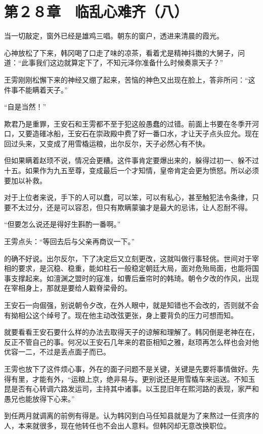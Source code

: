 \section{第２８章　临乱心难齐（八）}

当一切敲定，窗外已经是雄鸡三唱。朝东的窗户，透进来清晨的霞光。

心神放松了下来，韩冈喝了口走了味的凉茶，看着尤是精神抖擞的大舅子，问道：“此事我们这边就算定下了，不知元泽你准备什么时候奏禀天子？”

王雱刚刚松懈下来的神经又绷了起来，苦恼的神色又出现在脸上，答非所问：“这件事不能瞒着天子。”

“自是当然！”

欺君乃是重罪，王安石和王雱都不至于犯这般愚蠢的过错。前面上书要在冬季开河口，又要造碓冰船，王安石在崇政殿中费了好一番口水，才让天子点头应允。现在回过头来，又变成了用雪橇运粮，出尔反尔，天子必然心有不快。

但如果瞒着赵顼不说，情况会更糟。这件事肯定要爆出来的，躲得过初一、躲不过十五。如果作为九五至尊，变成最后一个才知情，皇帝肯定会更为愤怒。所以必须要加以补救。

对于上位者来说，手下的人可以蠢，可以笨，可以有私心，甚至触犯法令条律，只要不太过分，还是可以容忍，但只有欺瞒蒙骗才是最大的忌讳，让人忍耐不得。

“但要怎么说还是得好生斟酌一番啊。”

王雱点头：“等回去后与父亲再商议一下。”

的确不好说。出尔反尔，下了决定后又立刻更改，这就叫做行事轻佻。世间对于宰相的要求，是沉稳、稳重，能如柱石一般稳定朝廷大局，面对危殆局面，也能将国事支撑起来。如澶渊之盟时的寇准，如曹后垂帘时的韩琦。朝令夕改的作风，出现在宰相身上，那就是要给人戳脊梁骨的。

王安石一向倔强，别说朝令夕改，在外人眼中，就是知错也不会改的，否则就不会有拗相公这个绰号了。现在他主动改弦更张，身上要背负的压力可想而知。

就要看看王安石要什么样的办法去取得天子的谅解和理解了。韩冈倒是老神在在，反正不管自己的事。何况以王安石几年来的君臣相知之雅，赵顼再怎么样也会对他优容一二，不过是丢点面子而已。

王雱也放下了这件烦心事，外在的面子问题不是关键，关键是先要将事情做好。先得有里，才能有外，“运粮上京，绝非易与。更别说还是用雪橇车来运送。不知玉昆是否有心转调六路发运司，主持其中诸事。以玉昆旧年在熙河路的表现，家严和愚兄也能放得下心来。”

到任两月就调离的前例有得是。认为韩冈到白马任知县就是为了来熬过一任资序的人，本来就很多，现在他转任也不会出人意料。但韩冈却无意改换职位。

